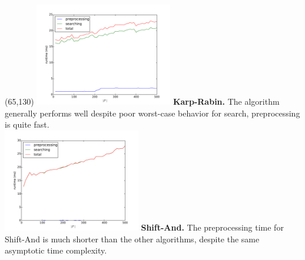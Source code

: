 \documentclass[a4paper]{article} %
\begin{document}
  \begin{textblock}{60}(65,130)
    \footnotesize      
      \includegraphics[width=60mm]{patterncount_Karp-Rabin.pdf}
      \textbf{Karp-Rabin.} The algorithm generally performs well despite poor worst-case behavior for search, preprocessing is quite fast.\\
      \includegraphics[width=60mm]{patterncount_Shift-And.pdf}
      \textbf{Shift-And.} The preprocessing time for Shift-And is much shorter than the other algorithms, despite the same asymptotic time complexity.\\
  \end{textblock}
\end{document}
